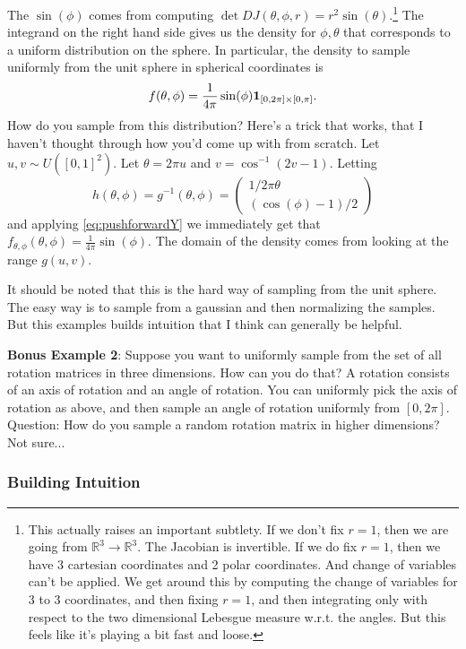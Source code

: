\documentclass{book}
\newcommand{\R}{\mathbb{R}}
\newcommand{\ones}{{\bf 1}}
\begin{document}
The $\sin(\phi)$ comes from computing $\det DJ(\theta, \phi, r) = r^2\sin(\theta)$.\footnote{This actually raises an important subtlety. If we don't fix $r=1$, then we are going from $\R^3\to \R^3$. The Jacobian is invertible. If we do fix $r=1$, then we have 3 cartesian coordinates and 2 polar coordinates. And change of variables can't be applied. We get around this by computing the change of variables for 3 to 3 coordinates, and then fixing $r=1$, and then integrating only with respect to the two dimensional Lebesgue measure w.r.t. the angles. But this feels like it's playing a bit fast and loose.}
The integrand on the right hand side gives us the density for $\phi, \theta$ that corresponds to a uniform distribution on the sphere. In particular, the density to sample uniformly from the unit sphere in spherical coordinates is
$$
f(\theta, \phi) = \frac{1}{4\pi}\sin(\phi)\ones_{[0, 2\pi]\times [0, \pi]}.
$$
How do you sample from this distribution? Here's a trick that works, that I haven't thought through how you'd come up with from scratch. Let $u,v\sim U([0,1]^2)$. Let $\theta = 2\pi u$ and $v = \cos^{-1}(2v-1)$. Letting
$$
h(\theta, \phi) = g^{-1}(\theta, \phi) = 
\begin{pmatrix}
1/2\pi \theta\\
(\cos(\phi) - 1)/2
\end{pmatrix}
$$ and 
applying \eqref{eq:pushforwardY} we immediately get that $f_{\theta, \phi}(\theta, \phi) = \frac{1}{4\pi}\sin(\phi)$. The domain of the density comes from looking at the range $g(u, v)$. 

It should be noted that this is the hard way of sampling from the unit sphere. The easy way is to sample from a gaussian and then normalizing the samples. But this examples builds intuition that I think can generally be helpful. 

\textbf{Bonus Example 2}: 
Suppose you want to uniformly sample from the set of all rotation matrices in three dimensions. How can you do that? A rotation consists of an axis of rotation and an angle of rotation. You can uniformly pick the axis of rotation as above, and then sample an angle of rotation uniformly from $[0, 2\pi]$. Question: How do you sample a random rotation matrix in higher dimensions? Not sure...


\vspace{1em}
\subsubsection{Building Intuition}
\end{document}
